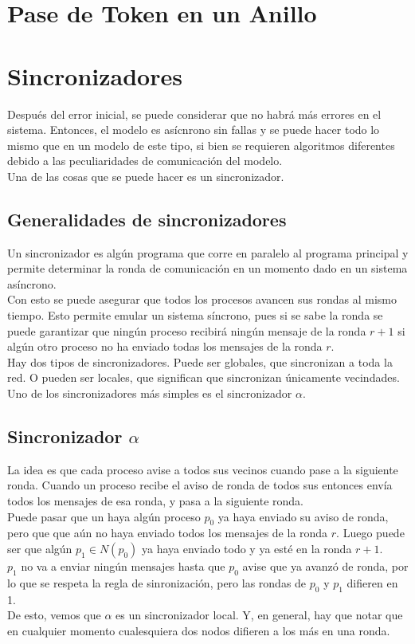 \documentclass[12pt,a4paper]{article}
\begin{document}
\section{Pase de Token en un Anillo}{}
\section{Sincronizadores}{
    Después del error inicial, se puede considerar que no habrá más errores
    en el sistema. Entonces, el modelo es asícnrono sin fallas y se puede hacer
    todo lo mismo que en un modelo de este tipo, si bien se requieren algoritmos
    diferentes debido a las peculiaridades de comunicación del modelo.\\
    Una de las cosas que se puede hacer es un sincronizador.

    \subsection{Generalidades de sincronizadores}{
    Un sincronizador es algún programa que corre en paralelo al programa
    principal y permite determinar la ronda de comunicación en un momento dado
    en un sistema asíncrono. \\
    Con esto se puede asegurar que todos los procesos avancen sus rondas al
    mismo tiempo. Esto permite emular un sistema síncrono, pues si se sabe la
    ronda se puede garantizar que ningún proceso recibirá ningún mensaje de
    la ronda $r+1$ si algún otro proceso no ha enviado todas los mensajes de
    la ronda $r$.\\
    Hay dos tipos de sincronizadores. Puede ser globales, que sincronizan a
    toda la red. O pueden ser locales, que significan que sincronizan únicamente
    vecindades.\\
    Uno de los sincronizadores más simples es el sincronizador $\alpha$.
    }

    \subsection{Sincronizador $\alpha$}{
        La idea es que cada proceso avise a todos sus
        vecinos cuando pase a la siguiente ronda. Cuando un proceso recibe el
        aviso de ronda de todos sus entonces envía todos los mensajes de esa
        ronda, y pasa a la siguiente ronda.\\
        Puede pasar que un haya algún proceso $p_0$ ya haya enviado su aviso de
        ronda, pero que que aún no haya enviado todos los mensajes de la ronda
        $r$. Luego puede ser que algún $p_1 \in N(p_0)$ ya haya enviado todo y
        ya esté en la ronda $r+1$.\\
        $p_1$ no va a enviar ningún mensajes hasta que $p_0$ avise que ya avanzó de
        ronda, por lo que se respeta la regla de sinronización, pero las rondas
        de $p_0$ y $p_1$ difieren en 1.\\
        De esto, vemos que $\alpha$ es un sincronizador local.
        Y, en general, hay que notar que en cualquier momento cualesquiera dos nodos
        difieren a los más en una ronda.
    }

}
\end{document}

